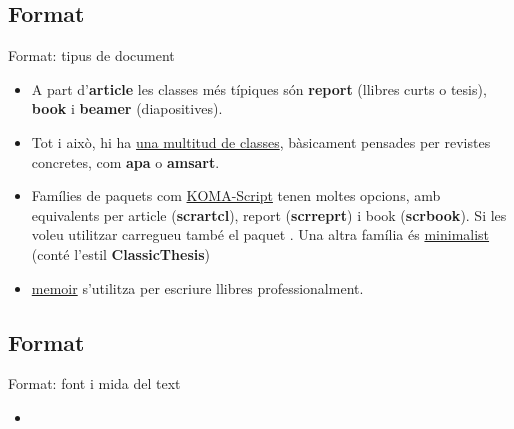 \subsection{Format}
\begin{frame}[fragile]{Format: tipus de document}
\begin{itemize}
\item A part d'\textbf{article} les classes més típiques són \textbf{report} (llibres curts o tesis), \textbf{book} i \textbf{beamer} (diapositives).
\item Tot i això, hi ha \href{https://ctan.org/topic/class}{una multitud de classes}, bàsicament pensades per revistes concretes, com \textbf{apa} o \textbf{amsart}.
\item Famílies de paquets com \href{https://ctan.org/pkg/koma-script}{KOMA-Script} tenen moltes opcions, amb equivalents per article (\textbf{scrartcl}), report (\textbf{scrreprt}) i book (\textbf{scrbook}). Si les voleu utilitzar carregueu també el paquet . Una altra família és \href{https://ctan.org/pkg/minimalist}{minimalist} (conté l'estil \textbf{ClassicThesis})
\item \href{https://ctan.org/pkg/memoir}{memoir} s'utilitza per escriure llibres professionalment.
\end{itemize}


\end{frame}

\subsection{Format}
\begin{frame}[fragile]{Format: font i mida del text}
\begin{itemize}
\item 
\end{itemize}

\begin{exampletiny}
\end{exampletiny}

\end{frame}

